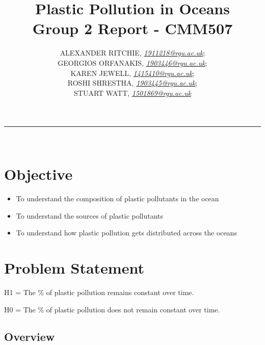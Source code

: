 \documentclass[10pt]{article}\usepackage[]{graphicx}\usepackage[]{color}
\begin{document}


\title{\LARGE Plastic Pollution in Oceans  \\ Group 2 Report - CMM507}

\author{ALEXANDER RITCHIE, \textit{\href{1911218@rgu.ac.uk}{1911218@rgu.ac.uk}};\\ GEORGIOS ORFANAKIS, \textit{\href{1903446@rgu.ac.uk}{1903446@rgu.ac.uk}};\\ KAREN JEWELL, \textit{\href{1415410@rgu.ac.uk}{1415410@rgu.ac.uk}};\\ ROSHI SHRESTHA, \textit{\href{1903445@rgu.ac.uk}{1903445@rgu.ac.uk}};\\ STUART WATT, \textit{\href{1501869@rgu.ac.uk}{1501869@rgu.ac.uk}}}

\maketitle
\noindent\rule{16cm}{0.4pt}
\ \\

\section*{Objective}


\begin{itemize}
\item To understand the composition of plastic pollutants in the ocean
\item To understand the sources of plastic pollutants
\item To understand how plastic pollution gets distributed across the oceans
\end{itemize}

\section{Problem Statement}\label{statement}

H1 = The \% of plastic pollution remains constant over time.

H0 = The \% of plastic pollution does not remain constant over time.




\subsection{Overview}\label{over}
\end{document}
